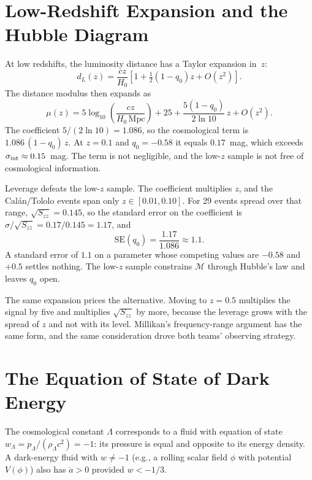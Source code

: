 \documentclass[12pt]{article}
\begin{document}
\section{Low-Redshift Expansion and the Hubble Diagram}
\label{app:lowz}

At low redshifts, the luminosity distance has a Taylor expansion in~$z$:
\begin{equation}\label{eq:dl_expand}
  d_L(z) = \frac{cz}{H_0}\left[1 + \tfrac{1}{2}(1-q_0)z + O(z^2)\right].
\end{equation}
The distance modulus then expands as
\begin{equation}\label{eq:mu_expand}
  \mu(z) = 5\log_{10}\!\left(\frac{cz}{H_0\,\text{Mpc}}\right) + 25
  + \frac{5(1-q_0)}{2\ln 10}\,z + O(z^2).
\end{equation}
The coefficient $5/(2\ln 10) = 1.086$, so the cosmological term is
$1.086\,(1-q_0)\,z$.  At $z = 0.1$ and $q_0 = -0.58$ it equals $0.17$~mag,
which exceeds $\sigma_{\rm int} \approx 0.15$~mag.  The term is not
negligible, and the low-$z$ sample is not free of cosmological information.

Leverage defeats the low-$z$ sample.  The
coefficient multiplies $z$, and the Cal\'an/Tololo events span only
$z \in [0.01, 0.10]$.  For 29 events spread over that range,
$\sqrt{S_{zz}} = 0.145$, so the standard error on the coefficient is
$\sigma/\sqrt{S_{zz}} = 0.17/0.145 = 1.17$, and
\begin{equation}\label{eq:seq0_lowz}
  \mathrm{SE}(q_0) = \frac{1.17}{1.086} \approx 1.1 .
\end{equation}
A standard error of $1.1$ on a parameter whose competing values are $-0.58$
and $+0.5$ settles nothing.  The low-$z$ sample constrains $\mathcal{M}$
through Hubble's law and leaves $q_0$ open.

The same expansion prices the alternative.  Moving to $z = 0.5$ multiplies the
signal by five and multiplies $\sqrt{S_{zz}}$ by more, because the leverage
grows with the spread of $z$ and not with its level.  Millikan's
frequency-range argument has the same form, and the same consideration drove
both teams' observing strategy.

\section{The Equation of State of Dark Energy}
\label{app:eos}

The cosmological constant $\Lambda$ corresponds to a fluid with equation
of state $w_\Lambda = p_\Lambda/(\rho_\Lambda c^2) = -1$: its pressure
is equal and opposite to its energy density.  A dark-energy fluid with
$w \neq -1$ (e.g., a rolling scalar field $\phi$ with potential $V(\phi)$)
also has $\ddot a > 0$ provided $w < -1/3$.
\end{document}
